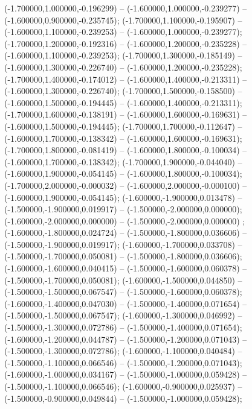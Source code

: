  (-1.700000,1.000000,-0.196299) -- (-1.600000,1.000000,-0.239277) -- (-1.600000,0.900000,-0.235745);
 (-1.700000,1.100000,-0.195907) -- (-1.600000,1.100000,-0.239253) -- (-1.600000,1.000000,-0.239277);
 (-1.700000,1.200000,-0.192316) -- (-1.600000,1.200000,-0.235228) -- (-1.600000,1.100000,-0.239253);
 (-1.700000,1.300000,-0.185149) -- (-1.600000,1.300000,-0.226740) -- (-1.600000,1.200000,-0.235228);
 (-1.700000,1.400000,-0.174012) -- (-1.600000,1.400000,-0.213311) -- (-1.600000,1.300000,-0.226740);
 (-1.700000,1.500000,-0.158500) -- (-1.600000,1.500000,-0.194445) -- (-1.600000,1.400000,-0.213311);
 (-1.700000,1.600000,-0.138191) -- (-1.600000,1.600000,-0.169631) -- (-1.600000,1.500000,-0.194445);
 (-1.700000,1.700000,-0.112647) -- (-1.600000,1.700000,-0.138342) -- (-1.600000,1.600000,-0.169631);
 (-1.700000,1.800000,-0.081419) -- (-1.600000,1.800000,-0.100034) -- (-1.600000,1.700000,-0.138342);
 (-1.700000,1.900000,-0.044040) -- (-1.600000,1.900000,-0.054145) -- (-1.600000,1.800000,-0.100034);
 (-1.700000,2.000000,-0.000032) -- (-1.600000,2.000000,-0.000100) -- (-1.600000,1.900000,-0.054145);
 (-1.600000,-1.900000,0.013478) -- (-1.500000,-1.900000,0.019917) -- (-1.500000,-2.000000,0.000000);
 (-1.600000,-2.000000,0.000000) -- (-1.500000,-2.000000,0.000000) ;
 (-1.600000,-1.800000,0.024724) -- (-1.500000,-1.800000,0.036606) -- (-1.500000,-1.900000,0.019917);
 (-1.600000,-1.700000,0.033708) -- (-1.500000,-1.700000,0.050081) -- (-1.500000,-1.800000,0.036606);
 (-1.600000,-1.600000,0.040415) -- (-1.500000,-1.600000,0.060378) -- (-1.500000,-1.700000,0.050081);
 (-1.600000,-1.500000,0.044850) -- (-1.500000,-1.500000,0.067547) -- (-1.500000,-1.600000,0.060378);
 (-1.600000,-1.400000,0.047030) -- (-1.500000,-1.400000,0.071654) -- (-1.500000,-1.500000,0.067547);
 (-1.600000,-1.300000,0.046992) -- (-1.500000,-1.300000,0.072786) -- (-1.500000,-1.400000,0.071654);
 (-1.600000,-1.200000,0.044787) -- (-1.500000,-1.200000,0.071043) -- (-1.500000,-1.300000,0.072786);
 (-1.600000,-1.100000,0.040484) -- (-1.500000,-1.100000,0.066546) -- (-1.500000,-1.200000,0.071043);
 (-1.600000,-1.000000,0.034167) -- (-1.500000,-1.000000,0.059428) -- (-1.500000,-1.100000,0.066546);
 (-1.600000,-0.900000,0.025937) -- (-1.500000,-0.900000,0.049844) -- (-1.500000,-1.000000,0.059428);
